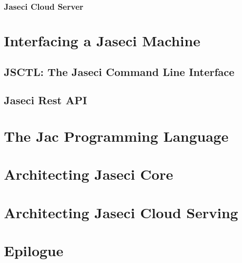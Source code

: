 \documentclass{book}
\begin{document}
\subsection{Jaseci Cloud Server}

\chapter{Interfacing a Jaseci Machine}
\section{JSCTL: The Jaseci Command Line Interface}
\section{Jaseci Rest API}

\chapter{The Jac Programming Language}


\chapter{Architecting Jaseci Core}

\chapter{Architecting Jaseci Cloud Serving}

\chapter*{Epilogue}
\end{document}
